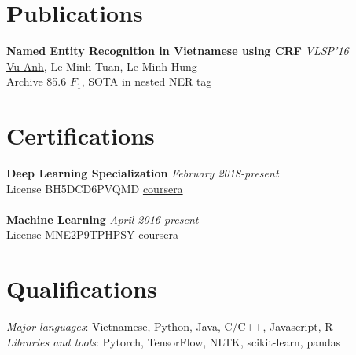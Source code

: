 \documentclass[11pt,a4paper,roman]{article}
\begin{document}
\section{Publications}

\textbf{Named Entity Recognition in Vietnamese using CRF}
\hfill
\textit{VLSP'16} \\
\underline{Vu Anh}, Le Minh Tuan, Le Minh Hung
\\
Archive 85.6 $F_{1}$, SOTA in nested NER tag

\section{Certifications}

\textbf{Deep Learning Specialization}
\hfill
\textit{February 2018-present} \\
License BH5DCD6PVQMD
\hfill
\href{https://www.coursera.org/account/accomplishments/verify/BH5DCD6PVQMD}{coursera}
\\\\
\textbf{Machine Learning}
\hfill
\textit{April 2016-present} \\
License MNE2P9TPHPSY
\hfill
\href{https://www.coursera.org/account/accomplishments/verify/MNE2P9TPHPSY}{coursera} 

\section{Qualifications}

\textit{Major languages}: Vietnamese, Python, Java, C/C++, Javascript, R
\\
\textit{Libraries and tools}: Pytorch, TensorFlow, NLTK, scikit-learn, pandas
\end{document}

